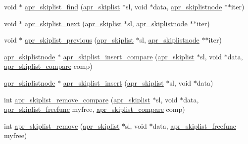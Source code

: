 \begin{DoxyCompactItemize}
\item 
void $\ast$ \hyperlink{group__apr__skiplist_gab28a7376e3483ae1104f2665d9859b95}{apr\+\_\+skiplist\+\_\+find} (\hyperlink{group__apr__skiplist_gac79ddf14bb5cb5b6d35961309eadec48}{apr\+\_\+skiplist} $\ast$sl, void $\ast$data, \hyperlink{group__apr__skiplist_gafb934f577d03de823aa4d62b41399bc0}{apr\+\_\+skiplistnode} $\ast$$\ast$iter)
\item 
void $\ast$ \hyperlink{group__apr__skiplist_gaca0e377b36847ed03c3a135f0f3f353e}{apr\+\_\+skiplist\+\_\+next} (\hyperlink{group__apr__skiplist_gac79ddf14bb5cb5b6d35961309eadec48}{apr\+\_\+skiplist} $\ast$sl, \hyperlink{group__apr__skiplist_gafb934f577d03de823aa4d62b41399bc0}{apr\+\_\+skiplistnode} $\ast$$\ast$iter)
\item 
void $\ast$ \hyperlink{group__apr__skiplist_ga02ff03a8282b561edf01b3291c154af4}{apr\+\_\+skiplist\+\_\+previous} (\hyperlink{group__apr__skiplist_gac79ddf14bb5cb5b6d35961309eadec48}{apr\+\_\+skiplist} $\ast$sl, \hyperlink{group__apr__skiplist_gafb934f577d03de823aa4d62b41399bc0}{apr\+\_\+skiplistnode} $\ast$$\ast$iter)
\item 
\hyperlink{group__apr__skiplist_gafb934f577d03de823aa4d62b41399bc0}{apr\+\_\+skiplistnode} $\ast$ \hyperlink{group__apr__skiplist_ga01b128d5160bc905f4b60a120ca10b2e}{apr\+\_\+skiplist\+\_\+insert\+\_\+compare} (\hyperlink{group__apr__skiplist_gac79ddf14bb5cb5b6d35961309eadec48}{apr\+\_\+skiplist} $\ast$sl, void $\ast$data, \hyperlink{group__apr__skiplist_ga873aa114e692e48c6587277680ceba87}{apr\+\_\+skiplist\+\_\+compare} comp)
\item 
\hyperlink{group__apr__skiplist_gafb934f577d03de823aa4d62b41399bc0}{apr\+\_\+skiplistnode} $\ast$ \hyperlink{group__apr__skiplist_ga1aaaa029b9f166baf320bf43e6887b4d}{apr\+\_\+skiplist\+\_\+insert} (\hyperlink{group__apr__skiplist_gac79ddf14bb5cb5b6d35961309eadec48}{apr\+\_\+skiplist} $\ast$sl, void $\ast$data)
\item 
int \hyperlink{group__apr__skiplist_ga9770c39604e7491da4c67282758690c2}{apr\+\_\+skiplist\+\_\+remove\+\_\+compare} (\hyperlink{group__apr__skiplist_gac79ddf14bb5cb5b6d35961309eadec48}{apr\+\_\+skiplist} $\ast$sl, void $\ast$data, \hyperlink{group__apr__skiplist_ga326fdccaf516e5296969fa03bbda3fca}{apr\+\_\+skiplist\+\_\+freefunc} myfree, \hyperlink{group__apr__skiplist_ga873aa114e692e48c6587277680ceba87}{apr\+\_\+skiplist\+\_\+compare} comp)
\item 
int \hyperlink{group__apr__skiplist_ga682f5e7dfcc4359097b9a4b96d053eff}{apr\+\_\+skiplist\+\_\+remove} (\hyperlink{group__apr__skiplist_gac79ddf14bb5cb5b6d35961309eadec48}{apr\+\_\+skiplist} $\ast$sl, void $\ast$data, \hyperlink{group__apr__skiplist_ga326fdccaf516e5296969fa03bbda3fca}{apr\+\_\+skiplist\+\_\+freefunc} myfree)
$$
\end{DoxyCompactItemize}
